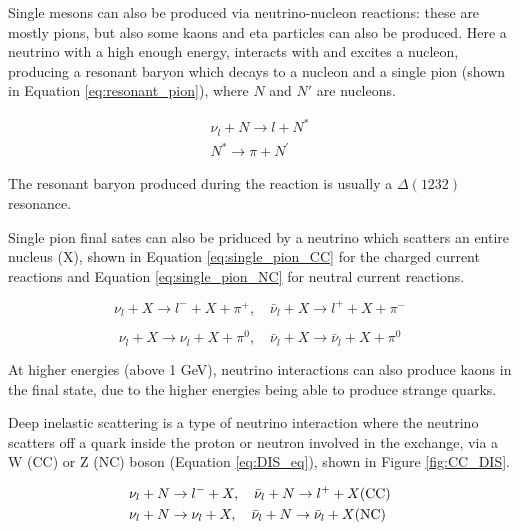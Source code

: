 Single mesons can also be produced via neutrino-nucleon reactions: these are mostly pions, but also some kaons and eta particles can also be produced. Here a neutrino with a high enough energy, interacts with and excites a nucleon, producing a resonant baryon which decays to a nucleon and a single pion (shown in Equation \ref{eq:resonant_pion}), where $N$ and $N'$ are nucleons.

$$
\begin{gathered}
\nu_{l}+N \rightarrow l+N^{*} \\
N^{*} \rightarrow \pi+N^{\prime}
\end{gathered}
\label{eq:resonant_pion}
$$

The resonant baryon produced during the reaction is usually a $\Delta(1232)$ resonance. 

Single pion final sates can also be priduced by a neutrino which scatters an entire nucleus (X), shown in Equation \ref{eq:single_pion_CC} for the charged current reactions and Equation \ref{eq:single_pion_NC} for neutral current reactions. 

\begin{equation}
\nu_{l}+X \rightarrow l^{-}+X+\pi^{+}, \quad \bar{\nu}_{l}+X \rightarrow l^{+}+X+\pi^{-}
\label{eq:single_pion_CC}
\end{equation}

\begin{equation}
\nu_{l}+X \rightarrow \nu_{l}+X+\pi^{0}, \quad \bar{\nu}_{l}+X \rightarrow \bar{\nu}_{l}+X+\pi^{0}
\label{eq:single_pion_NC}
\end{equation}

At higher energies (above 1 GeV), neutrino interactions can also produce kaons in the final state, due to the higher energies being able to produce strange quarks. 

Deep inelastic scattering is a type of neutrino interaction where the neutrino scatters off a quark inside the proton or neutron involved in the exchange, via a W (CC) or Z (NC) boson (Equation \ref{eq:DIS_eq}), shown in Figure \ref{fig:CC_DIS}.


\begin{align}
&\nu_{l}+N \rightarrow l^{-}+X, \quad \bar{\nu}_{l}+N \rightarrow l^{+}+X(\mathrm{CC}) \label{eq:DIS_eq}\\
&\nu_{l}+N \rightarrow \nu_{l}+X, \quad \bar{\nu}_{l}+N \rightarrow \bar{\nu}_{l}+X(\mathrm{NC}) \notag
\end{align}



